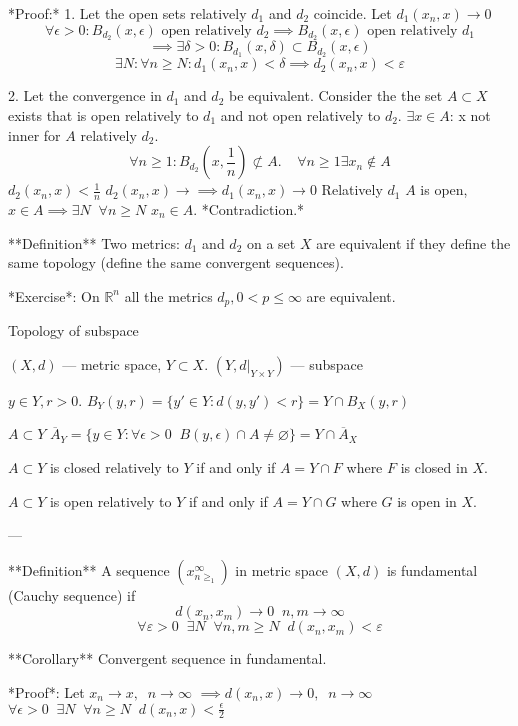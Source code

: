 *Proof:*
1. Let the open sets relatively $d_{1}$ and $d_{2}$ coincide.
Let $d_{1}(x_{n}, x) \to 0$
$$
\forall \epsilon > 0 : B_{d_{2}}(x,\epsilon) \text{ open relatively } d_{2} \implies B_{d_{2}}(x,\epsilon) \text{ open relatively } d_{1}
$$
$$
\implies \exists \delta > 0: B_{d_{1}}(x,\delta) \subset B_{d_{2}}(x,\epsilon)
$$
$$
\exists N: \forall n \geq N: d_{1}(x_{n}, x) < \delta \implies d_{2}(x_{n}, x) < \varepsilon
$$

2. Let the convergence in $d_{1}$ and $d_{2}$ be equivalent.
Consider the the set $A \subset X$ exists that is open relatively to $d_{1}$ and not open relatively to $d_{2}$.
$\exists x \in A$: x not inner for $A$ relatively $d_{2}$.
$$
\forall n \geq 1: B_{d_{2}}\left( x, \frac{1}{n} \right) \not\subset A.
\;\;\;\;
\forall n \geq 1 \exists x_{n} \not\in A
$$
$d_{2}(x_{n}, x) < \frac{1}{n}$
$d_{2}(x_{n}, x) \to \implies d_{1}(x_{n}, x) \to 0$
Relatively $d_{1}$ $A$ is open, $x \in A \implies \exists N \;\; \forall n \geq N$ 
$x_{n} \in A$. 
*Contradiction.*

**Definition**
Two metrics: $d_{1}$ and $d_{2}$ on a set $X$ are equivalent if they define the same topology (define the same convergent sequences).


*Exercise*: On $\mathbb{R}^{n}$ all the metrics $d_{p}, 0 < p \leq \infty$ are equivalent.

Topology of subspace

$(X, d)$ — metric space, $Y \subset X$.
$(Y, d|_{Y \times Y})$ — subspace

$y \in Y, r >0$.
$B_{Y}(y,r) = \{ y' \in Y: d(y, y') < r \} = Y \cap B_{X}(y,r)$

$A \subset Y$
$\overline{A}_{Y} = \{ y \in Y: \forall \epsilon > 0 \;\; B(y,\epsilon) \cap A \neq \varnothing \} = Y \cap \overline{A}_{X}$

$A \subset Y$ is closed relatively to $Y$ if and only if $A = Y \cap F$ where $F$ is closed in $X$.

$A \subset Y$ is open relatively to $Y$ if and only if $A = Y \cap G$ where $G$ is open in $X$.

---

**Definition**
A sequence $(x_{n \geq_{1}}^{\infty})$ in metric space $(X,d)$ is fundamental (Cauchy sequence) if
$$
d(x_{n}, x_{m}) \to 0 \;\; n,m \to \infty
$$
$$
\forall \varepsilon > 0 \;\; \exists N \;\; \forall n,m \geq N \;\; d(x_{n}, x_{m}) < \varepsilon
$$

**Corollary**
Convergent sequence in fundamental.

*Proof*:
Let $x_{n} \to x, \;\; n \to \infty$
$\implies d(x_{n}, x) \to 0, \;\; n \to \infty$
$\forall \epsilon > 0 \;\; \exists N \;\; \forall n \geq N \;\; d(x_{n}, x) < \frac{\epsilon}{2}$

